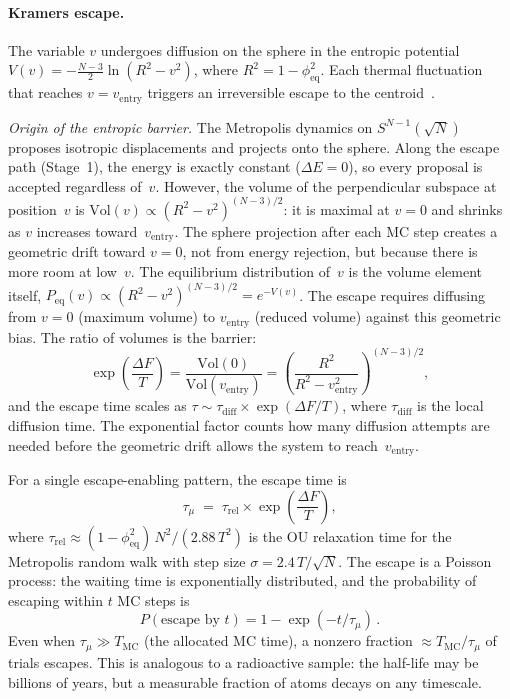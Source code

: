 \documentclass[11pt]{article}
\begin{document}
\paragraph{Kramers escape.}
The variable $v$ undergoes diffusion on the sphere in the entropic potential $V(v) = -\tfrac{N-3}{2}\ln(R^2 - v^2)$, where $R^2 = 1-\phi_{\mathrm{eq}}^2$.  Each thermal fluctuation that reaches $v = v_{\mathrm{entry}}$ triggers an irreversible escape to the centroid~\citep{kramers1940,hanggi1990}.

\begin{small}
\noindent\textit{Origin of the entropic barrier.}
The Metropolis dynamics on $S^{N-1}(\!\sqrt{N})$ proposes isotropic displacements and projects onto the sphere.  Along the escape path (Stage~1), the energy is exactly constant ($\Delta E = 0$), so every proposal is accepted regardless of~$v$.  However, the volume of the perpendicular subspace at position~$v$ is $\mathrm{Vol}(v) \propto (R^2 - v^2)^{(N-3)/2}$: it is maximal at $v = 0$ and shrinks as $v$ increases toward~$v_{\mathrm{entry}}$.  The sphere projection after each MC step creates a geometric drift toward $v = 0$, not from energy rejection, but because there is more room at low~$v$.  The equilibrium distribution of~$v$ is the volume element itself, $P_{\mathrm{eq}}(v) \propto (R^2 - v^2)^{(N-3)/2} = e^{-V(v)}$.  The escape requires diffusing from $v = 0$ (maximum volume) to $v_{\mathrm{entry}}$ (reduced volume) against this geometric bias.  The ratio of volumes is the barrier:
\[
\exp\!\left(\frac{\Delta F}{T}\right) = \frac{\mathrm{Vol}(0)}{\mathrm{Vol}(v_{\mathrm{entry}})} = \left(\frac{R^2}{R^2 - v_{\mathrm{entry}}^2}\right)^{(N-3)/2}\!,
\]
and the escape time scales as $\tau \sim \tau_{\mathrm{diff}} \times \exp(\Delta F/T)$, where $\tau_{\mathrm{diff}}$ is the local diffusion time.  The exponential factor counts how many diffusion attempts are needed before the geometric drift allows the system to reach~$v_{\mathrm{entry}}$.
\end{small}

For a single escape-enabling pattern, the escape time is
\begin{equation}
\tau_\mu \;=\; \tau_{\mathrm{rel}} \times \exp\!\left(\frac{\Delta F}{T}\right),
\label{eq:kramers_time}
\end{equation}
where $\tau_{\mathrm{rel}} \approx (1-\phi_{\mathrm{eq}}^2)\,N^2 / (2.88\,T^2)$ is the OU relaxation time for the Metropolis random walk with step size $\sigma = 2.4\,T/\sqrt{N}$.  The escape is a Poisson process: the waiting time is exponentially distributed, and the probability of escaping within $t$ MC steps is
\begin{equation}
P(\text{escape by } t) = 1 - \exp(-t/\tau_\mu)\,.
\label{eq:escape_prob}
\end{equation}
Even when $\tau_\mu \gg T_{\mathrm{MC}}$ (the allocated MC time), a nonzero fraction $\approx T_{\mathrm{MC}}/\tau_\mu$ of trials escapes.  This is analogous to a radioactive sample: the half-life may be billions of years, but a measurable fraction of atoms decays on any timescale.
\end{document}
